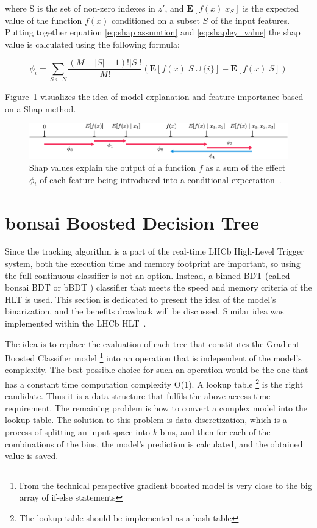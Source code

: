 where S is the set of non-zero indexes in $z'$, and $\mathbf{E}[f(x)|x_S]$ is the expected value of the function $f(x)$ conditioned on a subset $S$ of the input features. Putting together equation \ref{eq:shap assumtion} and \ref{eq:shapley_value} the shap value is calculated using the following formula:

\begin{equation}
        \phi_{i} = \sum_{S \subseteq N} \frac{(M-|S|-1)!|S|!}{M!}(\mathbf{E}[f(x)| S\cup \{i\}] - \mathbf{E}[f(x)|S])
\end{equation}

Figure~\ref{fig:shap_exp} visualizes the idea of model explanation and feature importance based on a Shap method. 


\begin{figure}[!h]
\centering
\includegraphics{figures/shap_explanation.png}
\caption{Shap values explain the output of a function $f$ as a sum of the effect $\phi_i$ of each feature being introduced into a conditional expectation~\cite{shap2}. 
\label{fig:shap_exp}}
\end{figure} 


\section{bonsai Boosted Decision Tree}
\label{sec:bbdt}
Since the tracking algorithm is a part of the real-time LHCb High-Level Trigger system, both the execution time and memory footprint are important, so using the full continuous classifier is not an option. Instead, a binned BDT (called bonsai BDT or bBDT ) classifier that meets the speed and memory criteria of the HLT is used. This section is dedicated to present the idea of the model's binarization, and the benefits drawback will be discussed. Similar idea was implemented within the LHCb HLT~\cite{bbdt}.


The idea is to replace the evaluation of each tree that constitutes the Gradient Boosted Classifier model \footnote{From the technical perspective gradient boosted model is very close to the big array of if-else statements} into an operation that is independent of the model's complexity. The best possible choice for such an operation would be the one that has a constant time computation complexity O(1).  A lookup table \footnote{The lookup table should be implemented as a hash table} is the right candidate. Thus it is a data structure that fulfils the above access time requirement. The remaining problem is how to convert a complex model into the lookup table.  The solution to this problem is data discretization, which is a process of splitting an input space into $k$ bins, and then for each of the combinations of the bins, the model's prediction is calculated, and the obtained value is saved. 

